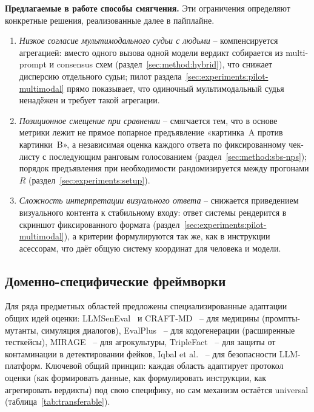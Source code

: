 \textbf{Предлагаемые в работе способы смягчения.}
Эти ограничения определяют конкретные решения, реализованные далее в
пайплайне.
\begin{enumerate}
    \item \emph{Низкое согласие мультимодального судьи с людьми} --
        компенсируется агрегацией: вместо одного вызова одной модели
        вердикт собирается из multi-prompt и consensus схем
        (раздел~\ref{sec:method:hybrid}), что снижает дисперсию
        отдельного судьи; пилот раздела~\ref{sec:experiments:pilot-multimodal}
        прямо показывает, что одиночный мультимодальный судья ненадёжен
        и требует такой агрегации.
    \item \emph{Позиционное смещение при сравнении} -- смягчается тем,
        что в основе метрики лежит не прямое попарное предъявление
        «картинка~A против картинки~B», а независимая оценка каждого
        ответа по фиксированному чек-листу с последующим ранговым
        голосованием (раздел~\ref{sec:method:sbs-nps}); порядок
        предъявления при необходимости рандомизируется между прогонами
        $R$ (раздел~\ref{sec:experiments:setup}).
    \item \emph{Сложность интерпретации визуального ответа} --
        снижается приведением визуального контента к стабильному
        входу: ответ системы рендерится в скриншот фиксированного
        формата (раздел~\ref{sec:experiments:pilot-multimodal}), а
        критерии формулируются так же, как в инструкции асессорам, что
        даёт общую систему координат для человека и модели.
\end{enumerate}

\subsection{Доменно-специфические фреймворки}

Для ряда предметных областей предложены специализированные адаптации
общих идей оценки: LLMSenEval~\cite{yan2025llmsemeval} и
CRAFT-MD~\cite{johri2025craftmd} -- для медицины (промпты-мутанты,
симуляция диалогов), EvalPlus~\cite{liu2023evalplus} -- для кодогенерации
(расширенные тесткейсы), MIRAGE~\cite{dongre2025mirage} --
для агрокультуры, TripleFact~\cite{xu2025triplefact} -- для защиты от
контаминации в детектировании фейков, Iqbal et al.~\cite{iqbal2024llmplatform}
-- для безопасности LLM-платформ.
Ключевой общий принцип: каждая область адаптирует протокол оценки
(как формировать данные, как формулировать инструкции, как
агрегировать вердикты) под свою специфику, но сам механизм остаётся
universal (таблица~\ref{tab:transferable}).

